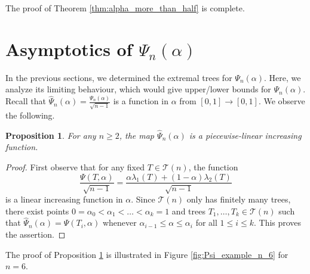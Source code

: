 \documentclass[11pt]{article}
\theoremstyle{plain}
\newtheorem{proposition}[theorem]{Proposition}
\numberwithin{equation}{section}
\begin{document}
The proof of Theorem \ref{thm:alpha_more_than_half} is complete.

\section{Asymptotics of $\Psi_n(\alpha)$}
\label{section:asymptotics_convex_combination}

In the previous sections, we determined the extremal trees for $\Psi_n(\alpha)$. Here, we analyze its limiting behaviour, which would give upper/lower bounds for $\Psi_n(\alpha)$. Recall that $\hat{\Psi}_n(\alpha) = \frac{\Psi_n(\alpha)}{\sqrt{n-1}}$ is a function in $\alpha$ from $[0, 1]\rightarrow [0,1]$. We observe the following.

\begin{proposition}\label{prop:Psi_piecewise_linear} For any $n\ge 2$, the map $\hat{\Psi}_n(\alpha)$ is a piecewise-linear increasing function.
\end{proposition}

\begin{proof}
First observe that for any fixed $T\in \mathcal{T}(n)$, the function \[\frac{\Psi(T, \alpha)}{\sqrt{n-1}} = \frac{\alpha \lambda_1(T) + (1-\alpha)\lambda_2(T)}{\sqrt{n-1}}\] is a linear increasing function in $\alpha$. Since $\mathcal{T}(n)$ only has finitely many trees, there exist points $0 =\alpha_0 < \alpha_1 <  \ldots < \alpha_k=1$ and trees $T_1, \ldots, T_k \in \mathcal{T}(n)$ such that $\hat{\Psi}_n(\alpha) = \Psi(T_i, \alpha)$
whenever $\alpha_{i-1}\le \alpha \le \alpha_i$ for all $1\le i\le k$. This proves the assertion. 
\end{proof}

The proof of Proposition \ref{prop:Psi_piecewise_linear} is illustrated in Figure \ref{fig:Psi_example_n_6} for $n = 6$.
\end{document}
